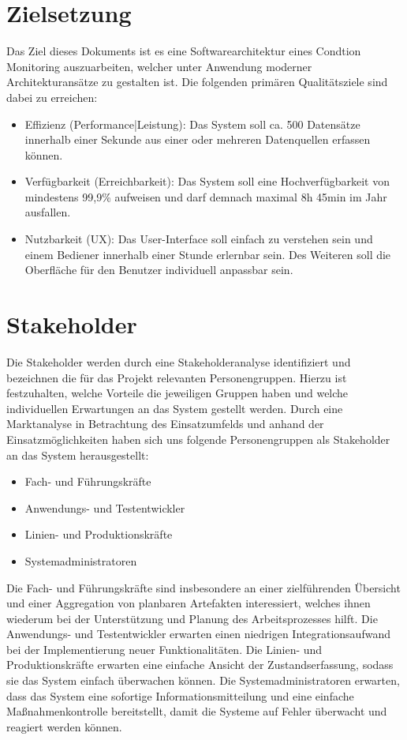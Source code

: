 \section{Zielsetzung}
Das Ziel dieses Dokuments ist es eine Softwarearchitektur eines Condtion Monitoring auszuarbeiten, welcher unter Anwendung moderner Architekturansätze zu gestalten ist. Die folgenden primären Qualitätsziele sind dabei zu erreichen:
\begin{itemize}
	\item Effizienz (Performance|Leistung): Das System soll ca. 500 Datensätze innerhalb einer Sekunde aus einer oder mehreren Datenquellen erfassen können.
 	\item Verfügbarkeit (Erreichbarkeit): Das System soll eine Hochverfügbarkeit von mindestens 99,9\% aufweisen und darf demnach maximal 8h 45min im Jahr ausfallen.
 	\item Nutzbarkeit (UX): Das User-Interface soll einfach zu verstehen sein und einem Bediener innerhalb einer Stunde erlernbar sein. Des Weiteren soll die Oberfläche für den Benutzer individuell anpassbar sein.
\end{itemize}

\section{Stakeholder}
Die Stakeholder werden durch eine Stakeholderanalyse identifiziert und bezeichnen die für das Projekt relevanten Personengruppen. 
Hierzu ist festzuhalten, welche Vorteile die jeweiligen Gruppen haben und welche individuellen Erwartungen an das System gestellt werden. Durch eine Marktanalyse in Betrachtung des Einsatzumfelds und anhand der Einsatzmöglichkeiten haben sich uns folgende Personengruppen als Stakeholder an das System herausgestellt:
\begin{itemize}
	\item Fach- und Führungskräfte
	\item Anwendungs- und Testentwickler
	\item Linien- und Produktionskräfte
	\item Systemadministratoren
\end{itemize}
Die Fach- und Führungskräfte sind insbesondere an einer zielführenden Übersicht und einer Aggregation von planbaren Artefakten interessiert, welches ihnen wiederum bei der Unterstützung und Planung des Arbeitsprozesses hilft.   
Die Anwendungs- und Testentwickler erwarten einen niedrigen Integrationsaufwand bei der Implementierung neuer Funktionalitäten. 
Die Linien- und Produktionskräfte erwarten eine einfache Ansicht der Zustandserfassung, sodass sie das System einfach überwachen können.
Die Systemadministratoren erwarten, dass das System eine sofortige Informationsmitteilung und eine einfache Maßnahmenkontrolle bereitstellt, damit die Systeme auf Fehler überwacht und reagiert werden können.

